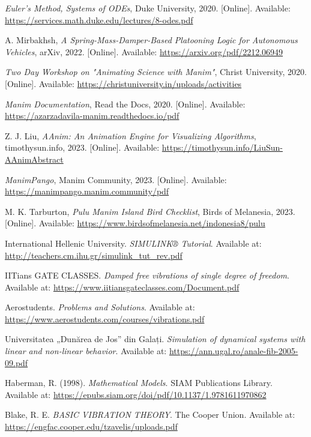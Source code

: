 \documentclass[12pt, a4paper, oneside]{report}
\begin{document}
\begin{thebibliography}{99}
	\textit{Euler's Method, Systems of ODEs}, Duke University, 2020. [Online]. Available: \url{https://services.math.duke.edu/lectures/8-odes.pdf}

	A. Mirbakhsh, \textit{A Spring-Mass-Damper-Based Platooning Logic for Autonomous Vehicles}, arXiv, 2022. [Online]. Available: \url{https://arxiv.org/pdf/2212.06949}


	\textit{Two Day Workshop on "Animating Science with Manim"}, Christ University, 2020. [Online]. Available: \url{https://christuniversity.in/uploads/activities}

	\textit{Manim Documentation}, Read the Docs, 2020. [Online]. Available: \url{https://azarzadavila-manim.readthedocs.io/pdf}

	Z. J. Liu, \textit{AAnim: An Animation Engine for Visualizing Algorithms}, timothysun.info, 2023. [Online]. Available: \url{https://timothysun.info/LiuSun-AAnimAbstract}

	\textit{ManimPango}, Manim Community, 2023. [Online]. Available: \url{https://manimpango.manim.community/pdf}

	M. K. Tarburton, \textit{Pulu Manim Island Bird Checklist}, Birds of Melanesia, 2023. [Online]. Available: \url{https://www.birdsofmelanesia.net/indonesia8/pulu}

	International Hellenic University. \textit{SIMULINK® Tutorial}. Available at: \url{http://teachers.cm.ihu.gr/simulink_tut_rev.pdf}

	IITians GATE CLASSES. \textit{Damped free vibrations of single degree of freedom}. Available at: \url{https://www.iitiansgateclasses.com/Document.pdf}

	Aerostudents. \textit{Problems and Solutions}. Available at: \url{https://www.aerostudents.com/courses/vibrations.pdf}

	Universitatea „Dunărea de Jos” din Galați. \textit{Simulation of dynamical systems with linear and non-linear behavior}. Available at: \url{https://ann.ugal.ro/anale-fib-2005-09.pdf}

	Haberman, R. (1998). \textit{Mathematical Models}. SIAM Publications Library. Available at: \url{https://epubs.siam.org/doi/pdf/10.1137/1.9781611970862}

	Blake, R. E. \textit{BASIC VIBRATION THEORY}. The Cooper Union. Available at: \url{https://engfac.cooper.edu/tzavelis/uploads.pdf}


\end{thebibliography}
\end{document}
